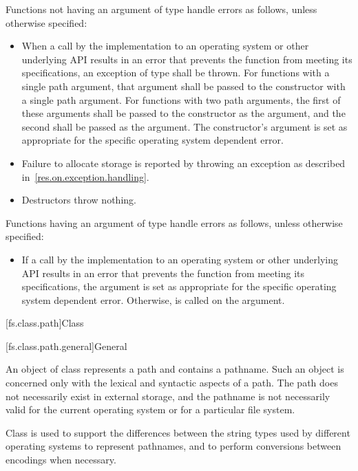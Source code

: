 \pnum
Functions not having an argument of type 
handle errors as follows, unless otherwise specified:
\begin{itemize}
\item When a call by the
  implementation to an operating system or other underlying API results in an
  error that prevents the function from meeting its specifications, an exception
  of type
 shall be thrown. For functions with a single path
  argument, that argument shall be passed to the
 constructor with a single path argument. For
  functions with two path arguments, the first of these arguments shall be
  passed to the
 constructor as the  argument,
  and the second shall be passed as the  argument. The
   constructor's  argument
  is set as appropriate for the specific operating system dependent error.
\item Failure to allocate storage is reported by throwing an exception
as described in~\ref{res.on.exception.handling}.
\item Destructors throw nothing.
\end{itemize}

\pnum
Functions having an argument of type 
handle errors as follows, unless otherwise specified:
\begin{itemize}
\item If a call by the
  implementation to an operating system or other underlying API results in an
  error that prevents the function from meeting its specifications, the
   argument is set as
  appropriate for the specific operating system dependent error. Otherwise, 
  is called on the
   argument.
\end{itemize}

[fs.class.path]{Class }

[fs.class.path.general]{General}

%
\pnum
An object of class  represents a path
and contains a pathname.
Such an object is concerned only with the lexical and syntactic aspects
of a path. The path does not necessarily exist in external storage, and the
pathname is not necessarily valid for the current operating
system or for a particular file system.

\pnum
\begin{note}
Class  is used to support the differences between the string types used by different operating systems to represent pathnames, and to perform conversions between encodings when necessary.
\end{note}

